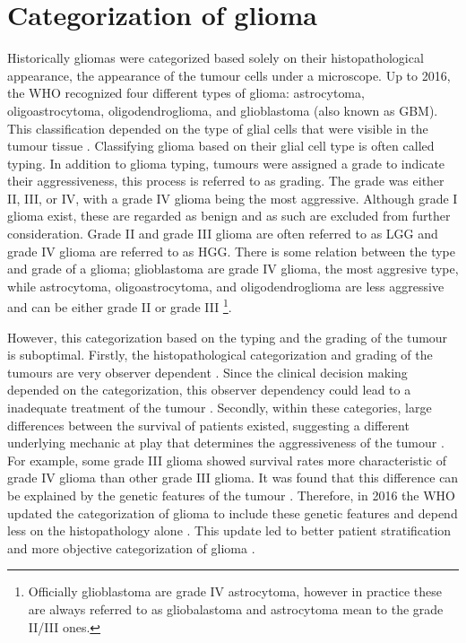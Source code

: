 \section{Categorization of glioma}
Historically gliomas were categorized based solely on their histopathological appearance, the appearance of the tumour cells under a microscope.
Up to 2016, the \gls{WHO} recognized four different types of glioma: astrocytoma, oligoastrocytoma, oligodendroglioma, and glioblastoma (also known as \gls{GBM}).
This classification depended on the type of glial cells that were visible in the tumour tissue \autocite{louis2007who}.
Classifying glioma based on their glial cell type is often called typing.
In addition to glioma typing, tumours were assigned a grade to indicate their aggressiveness, this process is referred to as grading.
The grade was either II, III, or IV, with a grade IV glioma being the most aggressive.
Although grade I glioma exist, these are regarded as benign and as such are excluded from further consideration.
Grade II and grade III glioma are often referred to as \gls{LGG} and grade IV glioma are referred to as \gls{HGG}.
There is some relation between the type and grade of a glioma; glioblastoma are grade IV glioma, the most aggresive type, while astrocytoma, oligoastrocytoma, and oligodendroglioma are less aggressive and can be either grade II or grade III \footnote{Officially glioblastoma are grade IV astrocytoma, however in practice these are always referred to as gliobalastoma and astrocytoma mean to the grade II/III ones.}.

However, this categorization based on the typing and the grading of the tumour is suboptimal.
Firstly, the histopathological categorization and grading of the tumours are very observer dependent \autocite{mittler1996gradingreliability, vandenbent2010interobserver}.
Since the clinical decision making depended on the categorization, this observer dependency could lead to a inadequate treatment of the tumour \autocite{vandenbent2010interobserver}.
Secondly, within these categories, large differences between the survival of patients existed, suggesting a different underlying mechanic at play that determines the aggressiveness of the tumour \autocite{dubbink2015molecular}.
For example, some grade III glioma showed survival rates more characteristic of grade IV glioma than other grade III glioma.
It was found that this difference can be explained by the genetic features of the tumour \autocite{dubbink2015molecular,eckel2015gliomagroups}.
Therefore, in 2016 the \gls{WHO} updated the categorization of glioma to include these genetic features and depend less on the histopathology alone \cite{louis20162016}.
This update led to better patient stratification and more objective categorization of glioma \autocite{molinaro2019geneticepidemiology}.

